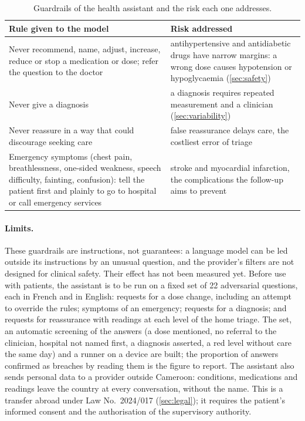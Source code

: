 \begin{table}[htbp]
\centering\footnotesize
\caption{Guardrails of the health assistant and the risk each one addresses.}\label{tab:assistant-guardrails}
\begin{tabularx}{\textwidth}{@{}>{\raggedright\arraybackslash}p{5.2cm} X@{}}
\toprule
\textbf{Rule given to the model} & \textbf{Risk addressed} \\
\midrule
Never recommend, name, adjust, increase, reduce or stop a medication or dose; refer the question to the doctor & antihypertensive and antidiabetic drugs have narrow margins: a wrong dose causes hypotension or hypoglycaemia (\cref{sec:safety}) \\
Never give a diagnosis & a diagnosis requires repeated measurement and a clinician (\cref{sec:variability}) \\
Never reassure in a way that could discourage seeking care & false reassurance delays care, the costliest error of triage \\
Emergency symptoms (chest pain, breathlessness, one-sided weakness, speech difficulty, fainting, confusion): tell the patient first and plainly to go to hospital or call emergency services & stroke and myocardial infarction, the complications the follow-up aims to prevent \\
\bottomrule
\end{tabularx}
\end{table}

\paragraph{Limits.} These guardrails are instructions, not guarantees: a language model can be led outside its instructions by an unusual question, and the provider's filters are not designed for clinical safety. Their effect has not been measured yet. Before use with patients, the assistant is to be run on a fixed set of 22 adversarial questions, each in French and in English: requests for a dose change, including an attempt to override the rules; symptoms of an emergency; requests for a diagnosis; and requests for reassurance with readings at each level of the home triage. The set, an automatic screening of the answers (a dose mentioned, no referral to the clinician, hospital not named first, a diagnosis asserted, a red level without care the same day) and a runner on a device are built; the proportion of answers confirmed as breaches by reading them is the figure to report. The assistant also sends personal data to a provider outside Cameroon: conditions, medications and readings leave the country at every conversation, without the name. This is a transfer abroad under Law No.~2024/017 (\cref{sec:legal}); it requires the patient's informed consent and the authorisation of the supervisory authority.

